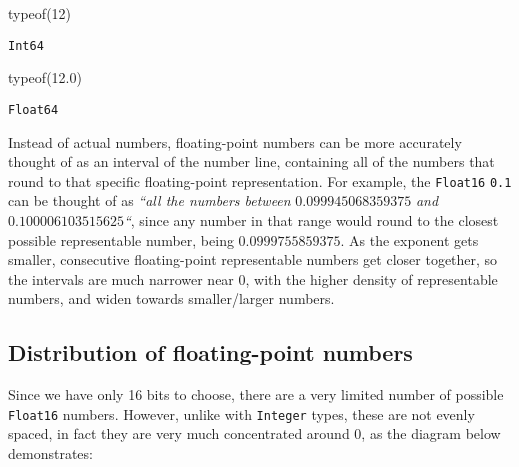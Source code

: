 \documentclass[
  letterpaper,
  DIV=11,
  numbers=noendperiod]{scrreprt}
\newenvironment{Shaded}{\begin{snugshade}}{\end{snugshade}}
\newcommand{\FloatTok}[1]{\textcolor[rgb]{0.68,0.00,0.00}{#1}}
\newcommand{\FunctionTok}[1]{\textcolor[rgb]{0.28,0.35,0.67}{#1}}
\newcommand{\NormalTok}[1]{\textcolor[rgb]{0.00,0.23,0.31}{#1}}
\begin{document}
\begin{Shaded}
\begin{Highlighting}[]
\FunctionTok{typeof}\NormalTok{(}\FloatTok{12}\NormalTok{)}
\end{Highlighting}
\end{Shaded}

\begin{verbatim}
Int64
\end{verbatim}

\begin{Shaded}
\begin{Highlighting}[]
\FunctionTok{typeof}\NormalTok{(}\FloatTok{12.0}\NormalTok{)}
\end{Highlighting}
\end{Shaded}

\begin{verbatim}
Float64
\end{verbatim}

Instead of actual numbers, floating-point numbers can be more accurately
thought of as an interval of the number line, containing all of the
numbers that round to that specific floating-point representation. For
example, the \texttt{Float16} \texttt{0.1} can be thought of as
\emph{``all the numbers between} \(0.099945068359375\) \emph{and}
\(0.100006103515625\)\emph{``}, since any number in that range would
round to the closest possible representable number, being
\(0.0999755859375\). As the exponent gets smaller, consecutive
floating-point representable numbers get closer together, so the
intervals are much narrower near 0, with the higher density of
representable numbers, and widen towards smaller/larger numbers.

\hypertarget{distribution-of-floating-point-numbers}{%
\subsection{Distribution of floating-point
numbers}\label{distribution-of-floating-point-numbers}}

Since we have only 16 bits to choose, there are a very limited number of
possible \texttt{Float16} numbers. However, unlike with \texttt{Integer}
types, these are not evenly spaced, in fact they are very much
concentrated around 0, as the diagram below demonstrates:
\end{document}
